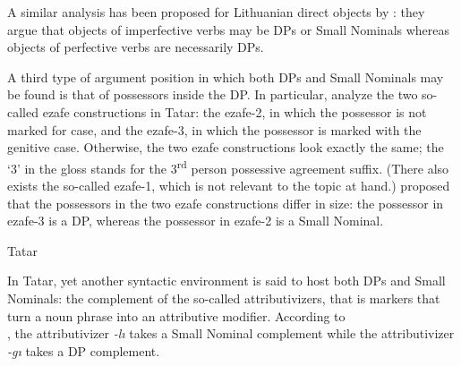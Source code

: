 \documentclass[output=paper]{langsci/langscibook}
\begin{document}
A similar analysis has been proposed for Lithuanian direct objects by \citet{GillonArmoskaite2015}: 
they argue that objects of imperfective verbs may be DPs or Small Nominals whereas objects of perfective verbs are necessarily DPs.

A third type of argument position in which both DPs and Small Nominals may be found is that of possessors inside the DP. 
In particular, \citet{LyutikovaPereltsvaig2015} analyze the two so-called ezafe constructions in Tatar: 
the ezafe-2, in which the possessor is not marked for case, 
and the ezafe-3, in which the possessor is marked with the genitive case. 
Otherwise, the two ezafe constructions look exactly the same; the `3' in the gloss stands for the 3\textsuperscript{rd} person possessive agreement suffix. 
(There also exists the so-called ezafe-1, which is not relevant to the topic at hand.) 
\citet{LyutikovaPereltsvaig2015} proposed that the possessors in the two ezafe constructions differ in size: 
the possessor in ezafe-3 is a DP, whereas the possessor in ezafe-2 is a Small Nominal. 

\ea%
    \label{pereex:key:4}
    Tatar 
    \z 
\z 

In Tatar, yet another syntactic environment is said to host both DPs and Small Nominals: 
the complement of the so-called attributivizers, that is markers that turn a noun phrase into an attributive modifier. 
According to\\ \citet{LyutikovaPereltsvaig2015}, the attributivizer \textit{{}-lı} takes a Small Nominal complement 
while the attributivizer \textit{{}-gı} takes a DP complement.

\end{document}

